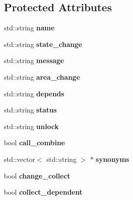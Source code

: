\subsection*{\-Protected \-Attributes}
\begin{DoxyCompactItemize}
\item 
\hypertarget{class_item_command_ae79c7cdf02b170b78bc5967a334cdcf7}{
std\-::string {\bfseries name}}
\label{class_item_command_ae79c7cdf02b170b78bc5967a334cdcf7}

\item 
\hypertarget{class_item_command_a7aa339b7c9c54ca6d331b9729cf8c044}{
std\-::string {\bfseries state\-\_\-change}}
\label{class_item_command_a7aa339b7c9c54ca6d331b9729cf8c044}

\item 
\hypertarget{class_item_command_a553f91c8eae8f25ba27ed0eb875e5e19}{
std\-::string {\bfseries message}}
\label{class_item_command_a553f91c8eae8f25ba27ed0eb875e5e19}

\item 
\hypertarget{class_item_command_ac5fe64207c12fbd50c3a8b92207acb40}{
std\-::string {\bfseries area\-\_\-change}}
\label{class_item_command_ac5fe64207c12fbd50c3a8b92207acb40}

\item 
\hypertarget{class_item_command_a6da1ba48131d1f2c414ad4728e7bb4c2}{
std\-::string {\bfseries depends}}
\label{class_item_command_a6da1ba48131d1f2c414ad4728e7bb4c2}

\item 
\hypertarget{class_item_command_a46091780df5b87f52db4e851deeb2aa1}{
std\-::string {\bfseries status}}
\label{class_item_command_a46091780df5b87f52db4e851deeb2aa1}

\item 
\hypertarget{class_item_command_ab48cc2be6ad392f61a4cc09d8ddaa061}{
std\-::string {\bfseries unlock}}
\label{class_item_command_ab48cc2be6ad392f61a4cc09d8ddaa061}

\item 
\hypertarget{class_item_command_a980a5aea68b7ace0a401561f81fc484e}{
bool {\bfseries call\-\_\-combine}}
\label{class_item_command_a980a5aea68b7ace0a401561f81fc484e}

\item 
\hypertarget{class_item_command_adc9ff7f20c2dec3f40bf5856d508cde2}{
std\-::vector$<$ std\-::string $>$ $\ast$ {\bfseries synonyms}}
\label{class_item_command_adc9ff7f20c2dec3f40bf5856d508cde2}

\item 
\hypertarget{class_item_command_a624650b662bbb506c74f943f40c9d9ea}{
bool {\bfseries change\-\_\-collect}}
\label{class_item_command_a624650b662bbb506c74f943f40c9d9ea}

\item 
\hypertarget{class_item_command_a6d69129934e185fbe2e8be0db40b0f94}{
bool {\bfseries collect\-\_\-dependent}}
\label{class_item_command_a6d69129934e185fbe2e8be0db40b0f94}

\end{DoxyCompactItemize}


